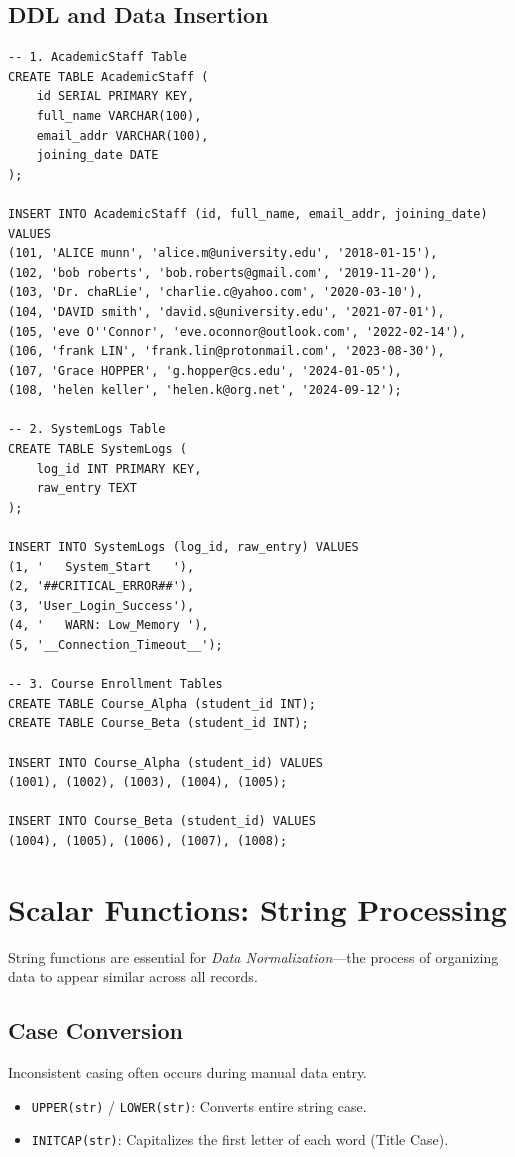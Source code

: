 \documentclass[12pt,a4paper]{article}
\begin{document}
\subsection{DDL and Data Insertion}
\begin{lstlisting}[caption=Environment Setup Script]
-- 1. AcademicStaff Table
CREATE TABLE AcademicStaff (
    id SERIAL PRIMARY KEY,
    full_name VARCHAR(100),
    email_addr VARCHAR(100),
    joining_date DATE
);

INSERT INTO AcademicStaff (id, full_name, email_addr, joining_date) VALUES
(101, 'ALICE munn', 'alice.m@university.edu', '2018-01-15'),
(102, 'bob roberts', 'bob.roberts@gmail.com', '2019-11-20'),
(103, 'Dr. chaRLie', 'charlie.c@yahoo.com', '2020-03-10'),
(104, 'DAVID smith', 'david.s@university.edu', '2021-07-01'),
(105, 'eve O''Connor', 'eve.oconnor@outlook.com', '2022-02-14'),
(106, 'frank LIN', 'frank.lin@protonmail.com', '2023-08-30'),
(107, 'Grace HOPPER', 'g.hopper@cs.edu', '2024-01-05'),
(108, 'helen keller', 'helen.k@org.net', '2024-09-12');

-- 2. SystemLogs Table
CREATE TABLE SystemLogs (
    log_id INT PRIMARY KEY,
    raw_entry TEXT
);

INSERT INTO SystemLogs (log_id, raw_entry) VALUES
(1, '   System_Start   '),
(2, '##CRITICAL_ERROR##'),
(3, 'User_Login_Success'),
(4, '   WARN: Low_Memory '),
(5, '__Connection_Timeout__');

-- 3. Course Enrollment Tables
CREATE TABLE Course_Alpha (student_id INT);
CREATE TABLE Course_Beta (student_id INT);

INSERT INTO Course_Alpha (student_id) VALUES 
(1001), (1002), (1003), (1004), (1005);

INSERT INTO Course_Beta (student_id) VALUES 
(1004), (1005), (1006), (1007), (1008);
\end{lstlisting}

\section{Scalar Functions: String Processing}
String functions are essential for \textit{Data Normalization}—the process of organizing data to appear similar across all records.

\subsection{Case Conversion}
Inconsistent casing often occurs during manual data entry.
\begin{itemize}
    \item \texttt{UPPER(str)} / \texttt{LOWER(str)}: Converts entire string case.
    \item \texttt{INITCAP(str)}: Capitalizes the first letter of each word (Title Case).
\end{itemize}
\end{document}
